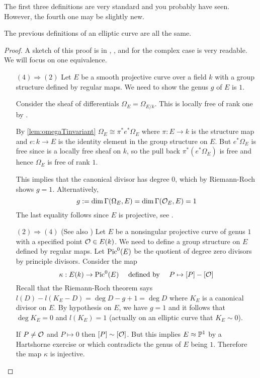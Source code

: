 \documentclass[11pt]{article}
\begin{document}
The first three definitions are very standard and you probably have seen. However, the fourth one may be slightly new.

\begin{prop}\label{ec:defs:equiv}
	The previous definitions of an elliptic curve are all the same.
\end{prop}
\begin{proof}
	A sketch of this proof is in \cite[Pg.~1]{milneAV}, \cite[Ch.~II]{milneEC}, and for the complex case \cite[Ch.~1.3]{diamondshurman} is very readable. We will focus on one equivalence.
	\begin{enumerate}
		\item[$(4)\Rightarrow(2)$] Let $E$ be a smooth projective curve over a field $k$ with a group structure defined by regular maps. We need to show the genus $g$ of $E$ is $1$.
		
		Consider the sheaf of differentials $\Omega_E=\Omega_{E/k}$. This is locally free of rank one by \cite[Prop.~6.2.2]{liu2006algebraic}.
		
		By \autoref{lem:omegaTinvariant}
		$\Omega_E \cong \pi^*e^*\Omega_E$ where $\pi:E \to k$ is the structure map and $e:k \to E$ is the identity element in the group structure on $E$. But $e^*\Omega_E$ is free since is a locally free sheaf on $k$, so the pull back $\pi^*(e^*\Omega_E)$ is free and hence $\Omega_E$ is free of rank $1$.
		
		This implies that the canonical divisor has degree $0$, which by Riemann-Roch shows $g = 1$.
		Alternatively,
		$$
		g := \dim\Gamma(\Omega_E,E) = \dim\Gamma(\mathcal{O}_E,E) = 1
		$$
		The last equality follows since $E$ is projective, see \cite[Thm.~I.3.4]{hartshorne}.
	
		\item[$(2)\Rightarrow(4)$](See also \cite[Ch.~III.3]{silverman1}) Let $E$ be a nonsingular projective curve of genus $1$ with a specified point $\mathcal{O}\in E(k)$. We need to define a group structure on $E$ defined by regular maps. Let $\operatorname{Pic}^0(E)$ be the quotient of degree zero divisors by principle divisors. Consider the map
		$$
		\kappa:E(k) \to \operatorname{Pic}^0(E) \quad\text{ defined by }\quad P \mapsto [P] - [\mathcal{O}]
		$$
		Recall that the Riemann-Roch theorem says $l(D) - l(K_E - D) = \deg D - g + 1 = \deg D$ where $K_E$ is a canonical divisor on $E$. By hypothesis on $E$, we have $g=1$ and it follows that $\deg K_E = 0$ and $l(K_E) = 1$ (actually on an elliptic curve that $K_E \sim 0$).
		
		If $P\neq \mathcal{O}$ and $P\mapsto 0$ then $[P] \sim [\mathcal{O}]$. But this implies $E\approx \mathbb{P}^1$ by a Hartshorne exercise or \cite[Ex.~II.2.5]{silverman1} which contradicts the genus of $E$ being $1$. Therefore the map $\kappa$ is injective.
		

\end{enumerate}
\end{proof}
\end{document}
